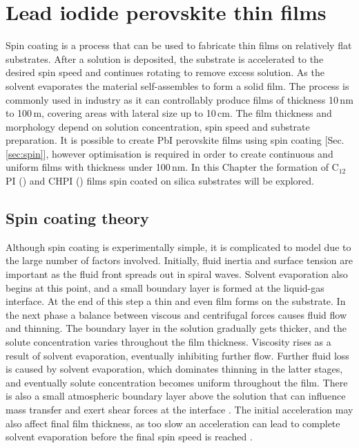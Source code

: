 
\chapter{Lead iodide perovskite thin films}

\graphicspath{{Chapter4/Figures/}}

Spin coating is a process that can be used to fabricate thin films on relatively flat substrates. After a solution is deposited, the substrate is accelerated to the desired spin speed and continues rotating to remove excess solution. As the solvent evaporates the material self-assembles to form a solid film. The process is commonly used in industry as it can controllably produce films of thickness 10\,nm to 100\,\textmu m, covering areas with lateral size up to 10\,cm. The film thickness and morphology depend on solution concentration, spin speed and substrate preparation. It is possible to create PbI perovskite films using spin coating [Sec.\,\ref{sec:spin}], however optimisation is required in order to create continuous and uniform films with thickness under 100\,nm. In this Chapter the formation of C$_{12}$PI () and CHPI () films spin coated on silica substrates will be explored.

\section{Spin coating theory}
Although spin coating is experimentally simple, it is complicated to model due to the large number of factors involved. Initially, fluid inertia and surface tension are important as the fluid front spreads out in spiral waves. Solvent evaporation also begins at this point, and a small boundary layer is formed at the liquid-gas interface. At the end of this step a thin and even film forms on the substrate. In the next phase a balance between viscous and centrifugal forces causes fluid flow and thinning. The boundary layer in the solution gradually gets thicker, and the solute concentration varies throughout the film thickness. Viscosity rises as a result of solvent evaporation, eventually inhibiting further flow. Further fluid loss is caused by solvent evaporation, which dominates thinning in the latter stages, and eventually solute concentration becomes uniform throughout the film. There is also a small atmospheric boundary layer above the solution that can influence mass transfer and exert shear forces at the interface \cite{Meyerhofer1978, VanHardeveld1995, Lawrence1988}. The initial acceleration may also affect final film thickness, as too slow an acceleration can lead to complete solvent evaporation before the final spin speed is reached \cite{Birnie2005}.

